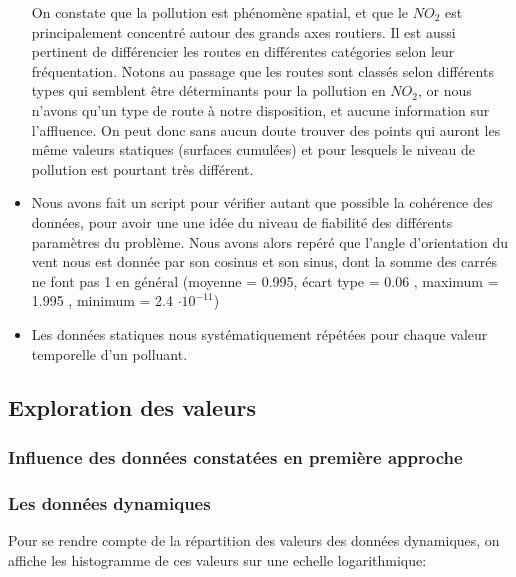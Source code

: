 \begin{itemize}
    On constate que la pollution est phénomène spatial, et que le $NO_2$ est principalement concentré autour des grands axes routiers. Il est aussi pertinent de différencier les routes en différentes catégories selon leur fréquentation. Notons au passage que les routes sont classés selon différents types qui semblent être déterminants pour la pollution en $NO_2$, or nous n'avons qu'un type de route à notre disposition, et aucune information sur l'affluence. On peut donc sans aucun doute trouver des points qui auront les même valeurs statiques (surfaces cumulées) et pour lesquels le niveau de pollution est pourtant très différent.    
  \item
    Nous avons fait un script pour vérifier autant que possible la cohérence des données, pour avoir une une idée du niveau de fiabilité des différents paramètres du problème. Nous avons alors repéré que l'angle d'orientation du vent nous est donnée par son cosinus et son sinus, dont la somme des carrés ne font pas 1 en général (moyenne = 0.995, écart type =  0.06 , maximum =  1.995 , minimum = 2.4 $\cdot 10^{-11}$)
  \item
    Les données statiques nous systématiquement répétées pour chaque valeur temporelle d'un polluant. %
    
\end{itemize}



\subsection{Exploration des valeurs}

\subsubsection{Influence des données constatées en première approche}

\subsubsection{Les données dynamiques}

Pour se rendre compte de la répartition des valeurs des données dynamiques, on affiche les histogramme de ces valeurs sur une echelle logarithmique:

